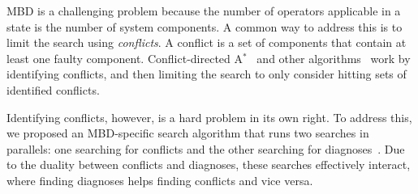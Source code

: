 \documentclass{article}
\newcommand{\astar}{A$^*$\xspace}
\newcommand{\mbd}{\ac{MBD}\xspace}
\newcommand{\na}{\ac{NA}\xspace}
\begin{document}
\mbd is a challenging problem because the number of operators applicable in a state is the number of system components. A common way to address this is to limit the search using \emph{conflicts}. A conflict is a set of components that contain at least one faulty component. Conflict-directed \astar~\cite{williams2007conflict} and other algorithms~\cite{reiter1987theory,de1987diagnosing} work by identifying conflicts, and then limiting the search to only consider hitting sets of identified conflicts. 

Identifying conflicts, however, is a hard problem in its own right. %
To address this, we proposed an \mbd-specific search algorithm that runs two searches in parallels: one searching for conflicts and the other searching for diagnoses~\cite{stern2012exploring}. Due to the duality between conflicts and diagnoses, these searches effectively interact, where finding diagnoses helps finding conflicts and vice versa.  






\end{document}
